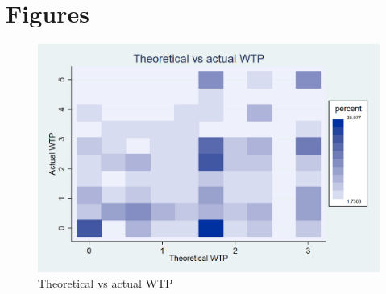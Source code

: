 \documentclass[12pt,a4paper]{article}
\begin{document}
 \label{main_wtp_tab}





%
%







 \label{het_wtp_tab}




\newpage
\section{Figures}


\begin{figure}[H]
\centering
\caption{Theoretical vs actual WTP}\label{wtp_heat_fig}
\includegraphics[scale=0.3]{Graphs/WTP_value_heat.png}
\end{figure}
\end{document}
